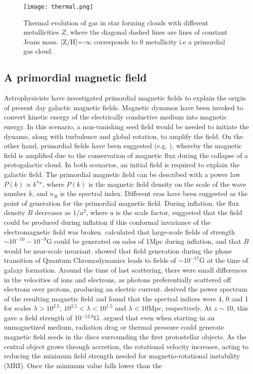 \documentclass[11pt]{article}
\begin{document}
\begin{figure}[!htb]
         \centering
		\texttt{[image: thermal.png]}
		\caption{Thermal evolution of gas in star forming clouds with different metallicities $Z$, where the diagonal dashed lines are lines of constant Jeans mass. [Z/H]=-$\infty$ corresponds to 0 metallicity i.e a primordial gas cloud. \citep{Omukai2005} }
		\label{fig:thermal}
\end{figure}





\subsection{A primordial magnetic field}
\label{sub:Bfield}
Astrophysicists have investigated primordial magnetic fields to explain the origin of present day galactic magnetic fields. Magnetic dynamos \citep{Vainshtein1980} have been invoked to convert kinetic energy of the electrically conductive medium into magnetic energy. In this scenario, a non-vanishing seed field would be needed to initiate the dynamo, along with turbulence and global rotation, to amplify the field. On the other hand, primordial fields have been suggested (e.g. \citealt{Kulsrud1990}), whereby the magnetic field is amplified due to the conservation of magnetic flux during the collapse of a protogalactic cloud. In both scenarios, an initial field is required to explain the galactic field. The primordial magnetic field can be described with a power law $P(k) \propto k^{n_B}$, where $P(k)$ is the magnetic field density on the scale of the wave number $k$, and $n_{B}$ is the spectral index. Different eras have been suggested as the point of generation for the primordial magnetic field. During inflation, the flux density $B$ decreases as $1/a^{2}$, where $a$ is the scale factor, \cite{Turner1988} suggested that the field could be produced during inflation if this conformal invariance of the electromagnetic field was broken. \cite{Bamba2004} calculated that large-scale fields of strength $\sim10^{-10}-10^{-9}$G could be generated on sales of 1Mpc during inflation, and that $B$ would be near-scale invariant. \cite{Quashnock1989} showed that field generation during the phase transition of Quantum Chromodynamics leads to fields of $\sim 10^{-17}$G at the time of galaxy formation. Around the time of last scattering, there were small differences in the velocities of ions and electrons, as photons preferentially scattered off electrons over protons, producing an electric current. \cite{Ichiki2006} derived the power spectrum of the resulting magnetic field and found that the spectral indices were 4, 0 and 1 for scales $\lambda  > 10^{2.5}$, $ 10^{2.5} < \lambda < 10^{1.5}$ and $\lambda<10$Mpc, respectively. At $z\sim10$, this gave a field strength of 10$^{-12.8}$G. \cite{Silk2006}  argued that even when starting in an unmagnetized medium, radiation drag or thermal pressure could generate magnetic field seeds in the discs surrounding the first protostellar objects. As the central object grows through accretion, the rotational velocity increases, acting to reducing the minimum field strength needed for magnetio-rotational instability (MRI). Once the minimum value falls lower than the 
\end{document}
